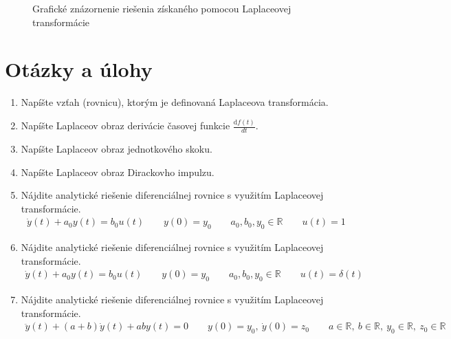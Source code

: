 \documentclass[a4paper, 10pt, ]{article}
\begin{document}
\begin{figure}[!ht]
	\centering


	\caption{Grafické znázornenie riešenia získaného pomocou Laplaceovej transformácie}
	\label{Grafické znázornenie riešenia získaného pomocou Laplaceovej transformácie}
\end{figure}








\section{Otázky a úlohy}

\begin{enumerate}[leftmargin=0pt, labelsep=3mm, itemsep=0pt]

    \item Napíšte vzťah (rovnicu), ktorým je definovaná Laplaceova transformácia.

    \item Napíšte Laplaceov obraz derivácie časovej funkcie $\frac{\text{d}f(t)}{dt}$.

    \item Napíšte Laplaceov obraz jednotkového skoku.

    \item Napíšte Laplaceov obraz Dirackovho impulzu.

    \item Nájdite analytické riešenie diferenciálnej rovnice s využitím Laplaceovej transformácie.
    \begin{align*}
        \dot y(t) + a_0 y(t) = b_0 u(t) \qquad y(0) = y_0 \qquad a_0, b_0, y_0\in\mathbb R \qquad u(t) = 1
    \end{align*}

    \item Nájdite analytické riešenie diferenciálnej rovnice s využitím Laplaceovej transformácie.
    \begin{align*}
        \dot y(t) + a_0 y(t) = b_0 u(t) \qquad y(0) = y_0 \qquad a_0, b_0, y_0\in\mathbb R \qquad u(t) = \delta(t)
    \end{align*}

    \item Nájdite analytické riešenie diferenciálnej rovnice s využitím Laplaceovej transformácie.
    \begin{align*}
        \ddot y(t) + (a+b) \dot y(t) + ab y(t) = 0 \qquad y(0) = y_0,\ \dot y(0) = z_0  \qquad a\in\mathbb R,\ b\in\mathbb R,\ y_0\in\mathbb R,\ z_0\in\mathbb R
    \end{align*}


\end{enumerate}
\end{document}

